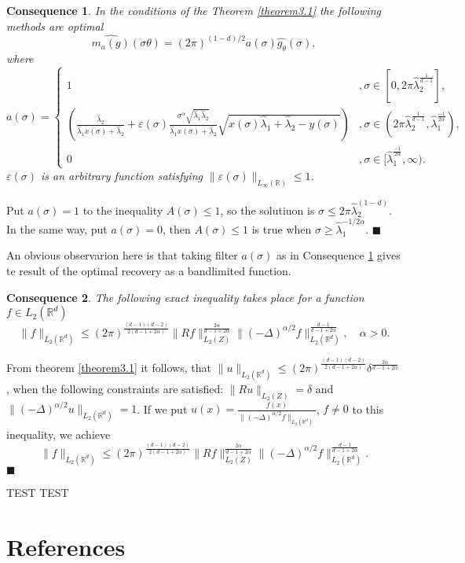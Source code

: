 \documentclass[12pt]{iopart}
\newtheorem{conseq}{Consequence}
\newenvironment{proof}
{\par\noindent{\bf Proof}}
{\hfill$\scriptstyle\blacksquare$}
\begin{document}
\begin{conseq}
\label{cons3.1}
In the conditions of the Theorem \ref{theorem3.1} the following methods are optimal $$
\widehat{m_a(g)}(\sigma\theta
)=(2\pi)^{(1-d)/2}a(\sigma)\widehat{g_\theta }(\sigma), $$ where
  \[
a(\sigma)=
  \begin{cases}
    1& ,\sigma\in [0,2\pi\widehat\lambda_2^\frac{1}{d-1}],\\
    \left(\frac{\widehat\lambda_2}{\widehat\lambda_1x(\sigma)+\widehat\lambda_2}+\varepsilon(\sigma)\frac{\sigma^\alpha\sqrt{\widehat\lambda_1\widehat\lambda_2}}{\widehat\lambda_1x(\sigma)+\widehat\lambda_2}\sqrt{x(\sigma)\widehat\lambda_1+\widehat\lambda_2-y(\sigma)}\right)& ,\sigma\in (2\pi\widehat\lambda_2^\frac{1}{d-1},\widehat\lambda_1^{\frac{-1}{2\alpha}}),\\
    0 &,\sigma\in [\widehat\lambda_1^{\frac{-1}{2\alpha}},\infty).
  \end{cases}
\]
$\varepsilon(\sigma)$ is an arbitrary function satisfying $\|\varepsilon(\sigma)\|_{L_\infty(\mathbb R)}\le 1$.
\end{conseq}

\begin{proof}
Put $a(\sigma)=1$ to the inequality $A(\sigma)\leqslant 1$, so the solutiuon is $\sigma\leqslant
  2\pi\widehat\lambda_2^{(1-d)}$. In the same way, put $a(\sigma)=0$,
  then $A(\sigma)\leqslant 1$ is true when $\sigma\geqslant
  \widehat\lambda_1^{-1/{2\alpha}}$.
\end{proof}

An obvious observarion here is that taking filter $a(\sigma)$ as in Consequence \ref{cons3.1} gives te result of the optimal recovery as a bandlimited function.


\begin{conseq}
\label{cons3.2}
The following exact inequality takes place for a function $f\in L_2(\mathbb R^d)$
\[
\|f\|_{L_2(\mathbb R^d)}\leqslant
(2\pi)^{\frac{(d-1)(d-2)}{2(d-1+2\alpha)}}\|Rf\|_{L_2(Z)}^{\frac{2\alpha}{d-1+2\alpha}}\|(-\Delta)^{\alpha/2}f\|_{L_2(\mathbb
  R^d)}^\frac{d-1}{d-1+2\alpha},\quad\alpha>0.
\]
\end{conseq}

\begin{proof}
From theorem \ref{theorem3.1} it follows, that \linebreak
 $\|u\|_{L_2(\mathbb R^d)}\leqslant
  (2\pi)^{\frac{(d-1)(d-2)}{2(d-1+2\alpha)}}\delta^{\frac{2\alpha}{d-1+2\alpha}}$, 
  when the following constraints are satisfied: $\|Ru\|_{L_2(Z)}=\delta$ and
  $\|(-\Delta)^{\alpha/2}u\|_{L_2(\mathbb R^d)}=1$. If we put
 $u(x)=\frac{f(x)}{\|(-\Delta)^{\alpha/2}f\|_{L_2(\mathbb R^d)}}$, $f\ne 0$ to this inequality, we achieve
\[
\|f\|_{L_2(\mathbb R^d)}\leqslant
(2\pi)^{\frac{(d-1)(d-2)}{2(d-1+2\alpha)}}\|Rf\|_{L_2(Z)}^{\frac{2\alpha}{d-1+2\alpha}}\|(-\Delta)^{\alpha/2}f\|_{L_2(\mathbb
  R^d)}^\frac{d-1}{d-1+2\alpha}.
\]
\end{proof}

TEST TEST


\section*{References}


\end{document}
